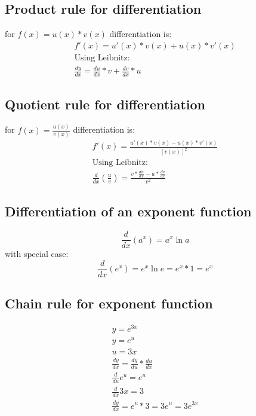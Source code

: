 \documentclass{article}
\begin{document}
\subsection{Product rule for differentiation}
for $f(x) = u(x)*v(x)$ differentiation is:
\begin{equation}
  \begin{gathered}
    f'(x) = u'(x)*v(x) + u(x)*v'(x) \\
    \text{Using Leibnitz:} \\
    \frac{dy}{dx} = \frac{du}{dx}*v + \frac{dv}{dx}*u
  \end{gathered}
\end{equation}
\subsection{Quotient rule for differentiation}
for $f(x) = \frac{u(x)}{v(x)}$ differentiation is:
\begin{equation}
  \begin{gathered}
    f'(x) = \frac{u'(x)*v(x) - u(x)*v'(x)}{[v(x)]^2} \\
    \text{Using Leibnitz:} \\
    \frac{d}{dx}(\frac{u}{v}) = \frac{v*\frac{du}{dx} - u*\frac{dv}{dx}}{v^2}
  \end{gathered}
\end{equation}
\subsection{Differentiation of an exponent function}
\begin{equation}
  \frac{d}{dx} (a^x) = a^x\ln a
\end{equation}
with special case:
\begin{equation}
  \frac{d}{dx} (e^x) = e^x\ln e = e^x * 1 = e^x
\end{equation}
\subsection{Chain rule for exponent function}
\begin{equation}
  \begin{gathered}
    y = e^{3x} \\
    y = e^u \\
    u = 3x \\
    \frac{dy}{dx} = \frac{dy}{du} * \frac{du}{dx} \\
    \frac{d}{du} e^u = e^u \\
    \frac{d}{dx} 3x = 3 \\
    \frac{dy}{dx} = e^u * 3 = 3e^u = 3e^{3x}
  \end{gathered}
\end{equation}
\end{document}
